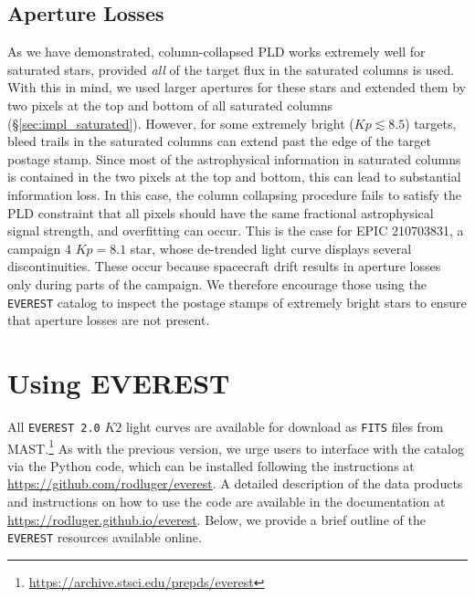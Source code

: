 \documentclass[]{emulateapj}
\newcommand{\Kp}{\ensuremath{Kp}}
\newcommand{\edited}[1]{{\color{red} #1}}
\begin{document}
\subsection{Aperture Losses}
\label{sec:losses}
As we have demonstrated, column-collapsed PLD works extremely well for saturated stars,
provided \emph{all} of the target flux in the saturated columns is used. With this
in mind, we used larger apertures for these stars and
extended them by two pixels at the top and bottom of all saturated columns
(\S\ref{sec:impl_saturated}). However, for some extremely bright ($\Kp \lesssim 8.5$)
targets, bleed trails in the saturated columns can extend past the edge of the
target postage stamp. Since most of the astrophysical information in saturated columns
is contained in the two pixels at the top and bottom, this can lead to substantial
information loss. In this case, the column collapsing procedure fails to satisfy the
PLD constraint that all pixels should have the same fractional astrophysical signal
strength, and overfitting can occur. This is the case for EPIC 210703831, a campaign 4
$\Kp = 8.1$ star, whose de-trended light curve displays several discontinuities. These
occur because spacecraft drift results in aperture losses only during parts of the
campaign. We therefore encourage those using the \texttt{EVEREST} catalog to inspect
the postage stamps of extremely bright stars to ensure that aperture losses are not
present.
%

\section{Using EVEREST}
\label{sec:using}
All \texttt{EVEREST 2.0} $K2$ light curves are available for download as \texttt{FITS} files
from MAST.\footnote{\url{https://archive.stsci.edu/prepds/everest}} As with the
previous version, we urge users to interface with the catalog via the Python code,
which can be installed following the instructions at
\url{https://github.com/rodluger/everest}. \edited{A detailed description of the data products
and instructions on how to use the code are available in the documentation at
\url{https://rodluger.github.io/everest}.} Below, we provide
a brief outline of the \texttt{EVEREST} resources available online.
\end{document}
